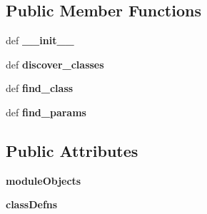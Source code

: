 \subsection*{Public Member Functions}
\begin{DoxyCompactItemize}
\item 
\hypertarget{classcheshire3_1_1internal_1_1_architecture_a0728ce4ccdc165497f04f25cce8de3a7}{def {\bfseries \-\_\-\-\_\-init\-\_\-\-\_\-}}\label{classcheshire3_1_1internal_1_1_architecture_a0728ce4ccdc165497f04f25cce8de3a7}

\item 
\hypertarget{classcheshire3_1_1internal_1_1_architecture_aa5c7437b835b7db66fe9fe572b82fc52}{def {\bfseries discover\-\_\-classes}}\label{classcheshire3_1_1internal_1_1_architecture_aa5c7437b835b7db66fe9fe572b82fc52}

\item 
\hypertarget{classcheshire3_1_1internal_1_1_architecture_a5ee36734360f2e1556e635ebcf3fdbbb}{def {\bfseries find\-\_\-class}}\label{classcheshire3_1_1internal_1_1_architecture_a5ee36734360f2e1556e635ebcf3fdbbb}

\item 
\hypertarget{classcheshire3_1_1internal_1_1_architecture_ae0d7d0de070df0f4242937577850b797}{def {\bfseries find\-\_\-params}}\label{classcheshire3_1_1internal_1_1_architecture_ae0d7d0de070df0f4242937577850b797}

\end{DoxyCompactItemize}
\subsection*{Public Attributes}
\begin{DoxyCompactItemize}
\item 
\hypertarget{classcheshire3_1_1internal_1_1_architecture_aae4e2007711240a1e63ed8fbb20116a2}{{\bfseries module\-Objects}}\label{classcheshire3_1_1internal_1_1_architecture_aae4e2007711240a1e63ed8fbb20116a2}

\item 
\hypertarget{classcheshire3_1_1internal_1_1_architecture_a709f321f314e4227f4dc3118d5c6fb46}{{\bfseries class\-Defns}}\label{classcheshire3_1_1internal_1_1_architecture_a709f321f314e4227f4dc3118d5c6fb46}

\end{DoxyCompactItemize}
